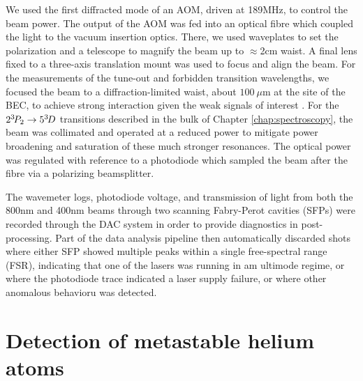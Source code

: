 	

	We used the first diffracted mode of an AOM, driven at 189MHz, to control the beam power. The output of the AOM was fed into an optical fibre which coupled the light to the vacuum insertion optics. There, we used waveplates to set the polarization and a telescope to magnify the beam up to $\approx$2cm waist. A final lens fixed to a three-axis translation mount was used to focus and align the beam. For the measurements of the tune-out and forbidden transition wavelengths, we focused the beam to a diffraction-limited waist, about $100~\mu$m at the site of the BEC, to achieve strong interaction given the weak signals of interest . For the $2^{3\!} P_2\rightarrow 5^{3\!} D$ transitions described in the bulk of Chapter \ref{chap:spectroscopy}, the beam was collimated and operated at a reduced power to mitigate power broadening and saturation of these much stronger resonances. The optical power was regulated with reference to a photodiode which sampled the beam after the fibre via a polarizing beamsplitter.

	The wavemeter logs, photodiode voltage, and transmission of light from both the 800nm and 400nm beams through two scanning Fabry-Perot cavities (SFPs) were recorded through the DAC system in order to provide diagnostics in post-processing. Part of the data analysis pipeline then automatically discarded shots where either SFP showed multiple peaks within a single free-spectral range (FSR), indicating that one of the lasers was running in am ultimode regime, or where the photodiode trace indicated a laser supply failure, or where other anomalous behavioru was detected.



\section{Detection of metastable helium atoms}

